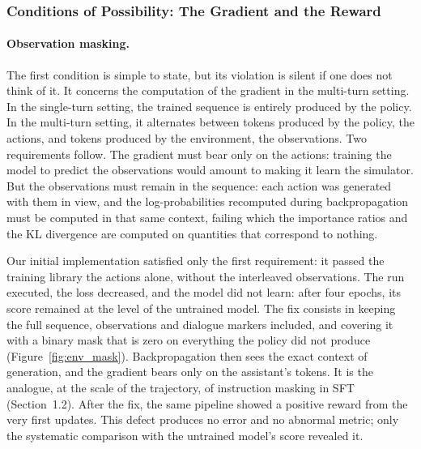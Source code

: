 \documentclass[11pt,a4paper]{article}
\begin{document}
\subsubsection{Conditions of Possibility: The Gradient and the Reward}

\paragraph{Observation masking.} The first condition is simple to state, but its violation is silent if one does not think of it. It concerns the computation of the gradient in the multi-turn setting. In the single-turn setting, the trained sequence is entirely produced by the policy. In the multi-turn setting, it alternates between tokens produced by the policy, the actions, and tokens produced by the environment, the observations. Two requirements follow. The gradient must bear only on the actions: training the model to predict the observations would amount to making it learn the simulator. But the observations must remain in the sequence: each action was generated with them in view, and the log-probabilities recomputed during backpropagation must be computed in that same context, failing which the importance ratios and the KL divergence are computed on quantities that correspond to nothing.

Our initial implementation satisfied only the first requirement: it passed the training library the actions alone, without the interleaved observations. The run executed, the loss decreased, and the model did not learn: after four epochs, its score remained at the level of the untrained model. The fix consists in keeping the full sequence, observations and dialogue markers included, and covering it with a binary mask that is zero on everything the policy did not produce (Figure~\ref{fig:env_mask}). Backpropagation then sees the exact context of generation, and the gradient bears only on the assistant's tokens. It is the analogue, at the scale of the trajectory, of instruction masking in SFT (Section~1.2). After the fix, the same pipeline showed a positive reward from the very first updates. This defect produces no error and no abnormal metric; only the systematic comparison with the untrained model's score revealed it.
\end{document}
